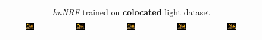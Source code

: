 \begingroup
\begin{figure}[!htb]
    \centering
    \setlength\tabcolsep{0pt}
    \begin{tabular*}{\textwidth}{ c c c c c }
        \multicolumn{5}{c}{\textit{ImNRF} trained on \textbf{colocated} light dataset} \\
          \includegraphics[width=0.2\textwidth]{figures/results/arb_set/dynamic_light/imnf_coloc_vc0_ld-90.png}
        & \includegraphics[width=0.2\textwidth]{figures/results/arb_set/dynamic_light/imnf_coloc_vc0_ld-60.png}
        & \includegraphics[width=0.2\textwidth]{figures/results/arb_set/dynamic_light/imnf_coloc_vc0_ld0.png}
        & \includegraphics[width=0.2\textwidth]{figures/results/arb_set/dynamic_light/imnf_coloc_vc0_ld60.png} 
        & \includegraphics[width=0.2\textwidth]{figures/results/arb_set/dynamic_light/imnf_coloc_vc0_ld90.png} \\
        

\end{tabular*}
\end{figure}
